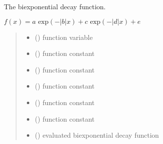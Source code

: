 \documentclass[letterpaper,10pt,english]{sphinxmanual}
\begin{document}
\begin{fulllineitems}
\label{\detokenize{01_utils:skinoptics.utils.biexp_decay}}
\pysigstartsignatures
{}
\pysigstopsignatures
\sphinxAtStartPar
The biexponential decay function.

\sphinxAtStartPar
\(f(x) = a\mbox{ exp}(-|b|x) + c \mbox{ exp}(-|d|x) + e\)
\begin{quote}\begin{description}
\begin{itemize}
\item {} 
\sphinxAtStartPar
{} () \textendash{} function variable

\item {} 
\sphinxAtStartPar
{} () \textendash{} function constant

\item {} 
\sphinxAtStartPar
{} () \textendash{} function constant

\item {} 
\sphinxAtStartPar
{} () \textendash{} function constant

\item {} 
\sphinxAtStartPar
{} () \textendash{} function constant

\item {} 
\sphinxAtStartPar
{} () \textendash{} function constant

\end{itemize}

\sphinxAtStartPar
\begin{itemize}
\item {} 
\sphinxAtStartPar
{} () \textendash{} evaluated biexponential decay function

\end{itemize}


\end{description}\end{quote}

\end{fulllineitems}
\end{document}
